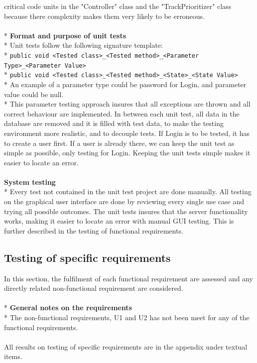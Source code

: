 \documentclass[a4paper,11pt,report]{article}
\begin{document}
critical code units in the "Controller" class and the "TrackPrioritizer" class because there complexity makes them very likely to be erroneous.\\ \\*
\textbf{Format and purpose of unit tests}\\*
Unit tests follow the following signature template:
\\*
\verb|public void <Tested class>_<Tested method>_<Parameter Type>_<Parameter Value>|
\\*
\verb|public void <Tested class>_<Tested method>_<State>_<State Value>|
\\*
An example of a parameter type could be password for Login, and parameter value could be null. \\*
This parameter testing approach insures that all exceptions are thrown and all correct behaviour are implemented. In between each unit test, all data in the database are removed and it is filled with test data, to make the testing environment more realistic, and to decouple tests. If Login is to be tested, it has to create a user first. If a user is already there, we can keep the unit test as simple as possible, only testing for Login. Keeping the unit tests simple makes it easier to locate an error. \\ \\
\textbf{System testing}\\*
Every test not contained in the unit test project are done manually. All testing on the graphical user interface are done by reviewing every single use case and trying all possible outcomes. The unit tests insures that the server functionality works, making it easier to locate an error with manual GUI testing. This is further described in the testing of functional requirements.

\subsection{Testing of specific requirements}
In this section, the fulfilment of each functional requirement are assessed and any directly related non-functional requirement are considered. \\ \\*
\textbf{General notes on the requirements} \\*
The non-functional requirements, U1 and U2 has not been meet for any of the functional requirements. \\ \\
All results on testing of specific requirements are in the appendix under textual items.
\end{document}
